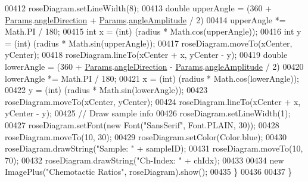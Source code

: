 \begin{DoxyCode}
00412     roseDiagram.setLineWidth(8);
00413     \textcolor{keywordtype}{double} upperAngle = (360 + \hyperlink{classdata_1_1_params}{Params}.\hyperlink{classdata_1_1_params_a11ad187f45e1f7add56bde4071bfdf74}{angleDirection} + 
      \hyperlink{classdata_1_1_params}{Params}.\hyperlink{classdata_1_1_params_a42568ad774d8f4ccb9535aeda39fc883}{angleAmplitude} / 2) %
00414     upperAngle *= Math.PI / 180;
00415     \textcolor{keywordtype}{int} x = (int) (radius * Math.cos(upperAngle));
00416     \textcolor{keywordtype}{int} y = (int) (radius * Math.sin(upperAngle));
00417     roseDiagram.moveTo(xCenter, yCenter);
00418     roseDiagram.lineTo(xCenter + x, yCenter - y);
00419     \textcolor{keywordtype}{double} lowerAngle = (360 + \hyperlink{classdata_1_1_params}{Params}.\hyperlink{classdata_1_1_params_a11ad187f45e1f7add56bde4071bfdf74}{angleDirection} - 
      \hyperlink{classdata_1_1_params}{Params}.\hyperlink{classdata_1_1_params_a42568ad774d8f4ccb9535aeda39fc883}{angleAmplitude} / 2) %
00420     lowerAngle *= Math.PI / 180;
00421     x = (int) (radius * Math.cos(lowerAngle));
00422     y = (int) (radius * Math.sin(lowerAngle));
00423     roseDiagram.moveTo(xCenter, yCenter);
00424     roseDiagram.lineTo(xCenter + x, yCenter - y);
00425     \textcolor{comment}{// Draw sample info}
00426     roseDiagram.setLineWidth(1);
00427     roseDiagram.setFont(\textcolor{keyword}{new} Font(\textcolor{stringliteral}{"SansSerif"}, Font.PLAIN, 30));
00428     roseDiagram.moveTo(10, 30);
00429     roseDiagram.setColor(Color.blue);
00430     roseDiagram.drawString(\textcolor{stringliteral}{"Sample: "} + sampleID);
00431     roseDiagram.moveTo(10, 70);
00432     roseDiagram.drawString(\textcolor{stringliteral}{"Ch-Index: "} + chIdx);
00433 
00434     \textcolor{keyword}{new} ImagePlus(\textcolor{stringliteral}{"Chemotactic Ratios"}, roseDiagram).show();
00435   \}
00436 
00437 \}
\end{DoxyCode}
